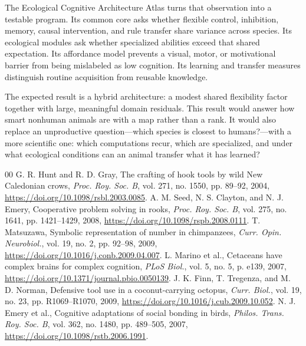 \documentclass[conference]{IEEEtran}
\begin{document}
The Ecological Cognitive Architecture Atlas turns that observation into a testable program. Its common core asks whether flexible control, inhibition, memory, causal intervention, and rule transfer share variance across species. Its ecological modules ask whether specialized abilities exceed that shared expectation. Its affordance model prevents a visual, motor, or motivational barrier from being mislabeled as low cognition. Its learning and transfer measures distinguish routine acquisition from reusable knowledge.

The expected result is a hybrid architecture: a modest shared flexibility factor together with large, meaningful domain residuals. This result would answer how smart nonhuman animals are with a map rather than a rank. It would also replace an unproductive question---which species is closest to humans?---with a more scientific one: which computations recur, which are specialized, and under what ecological conditions can an animal transfer what it has learned?

\balance
\begin{thebibliography}{00}
 G. R. Hunt and R. D. Gray, The crafting of hook tools by wild New Caledonian crows, \emph{Proc. Roy. Soc. B}, vol. 271, no. 1550, pp. 89--92, 2004, \url{https://doi.org/10.1098/rsbl.2003.0085}.
 A. M. Seed, N. S. Clayton, and N. J. Emery, Cooperative problem solving in rooks, \emph{Proc. Roy. Soc. B}, vol. 275, no. 1641, pp. 1421--1429, 2008, \url{https://doi.org/10.1098/rspb.2008.0111}.
 T. Matsuzawa, Symbolic representation of number in chimpanzees, \emph{Curr. Opin. Neurobiol.}, vol. 19, no. 2, pp. 92--98, 2009, \url{https://doi.org/10.1016/j.conb.2009.04.007}.
 L. Marino et al., Cetaceans have complex brains for complex cognition, \emph{PLoS Biol.}, vol. 5, no. 5, p. e139, 2007, \url{https://doi.org/10.1371/journal.pbio.0050139}.
 J. K. Finn, T. Tregenza, and M. D. Norman, Defensive tool use in a coconut-carrying octopus, \emph{Curr. Biol.}, vol. 19, no. 23, pp. R1069--R1070, 2009, \url{https://doi.org/10.1016/j.cub.2009.10.052}.
 N. J. Emery et al., Cognitive adaptations of social bonding in birds, \emph{Philos. Trans. Roy. Soc. B}, vol. 362, no. 1480, pp. 489--505, 2007, \url{https://doi.org/10.1098/rstb.2006.1991}.
\end{thebibliography}
\end{document}
